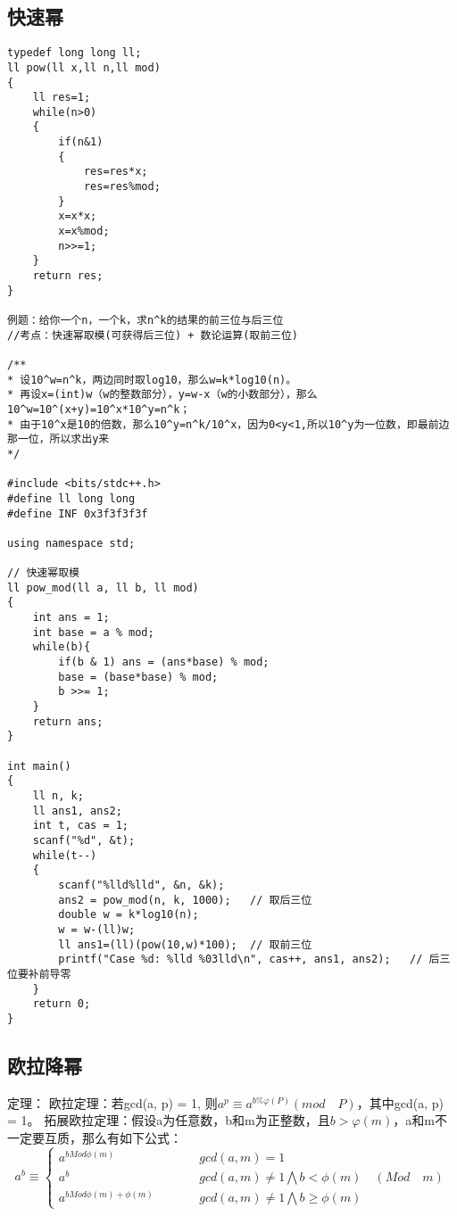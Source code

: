 \subsection{快速幂}
\begin{lstlisting}
typedef long long ll;
ll pow(ll x,ll n,ll mod)
{
	ll res=1;
	while(n>0)
	{
		if(n&1)	
		{
			res=res*x;
			res=res%mod;
		}
		x=x*x;
		x=x%mod;
		n>>=1;
	}
	return res;	
}

例题：给你一个n，一个k，求n^k的结果的前三位与后三位
//考点：快速幂取模(可获得后三位) + 数论运算(取前三位)

/**
* 设10^w=n^k，两边同时取log10，那么w=k*log10(n)。
* 再设x=(int)w（w的整数部分），y=w-x（w的小数部分），那么10^w=10^(x+y)=10^x*10^y=n^k；
* 由于10^x是10的倍数，那么10^y=n^k/10^x，因为0<y<1,所以10^y为一位数，即最前边那一位，所以求出y来
*/

#include <bits/stdc++.h>
#define ll long long
#define INF 0x3f3f3f3f

using namespace std;

// 快速幂取模
ll pow_mod(ll a, ll b, ll mod)
{
	int ans = 1;
	int base = a % mod;
	while(b){
		if(b & 1) ans = (ans*base) % mod;
		base = (base*base) % mod;
		b >>= 1;
	}
	return ans;
}

int main()
{
	ll n, k;
	ll ans1, ans2;
	int t, cas = 1;
	scanf("%d", &t);
	while(t--)
	{
		scanf("%lld%lld", &n, &k);
		ans2 = pow_mod(n, k, 1000);   // 取后三位
		double w = k*log10(n);
		w = w-(ll)w;
		ll ans1=(ll)(pow(10,w)*100);  // 取前三位
		printf("Case %d: %lld %03lld\n", cas++, ans1, ans2);   // 后三位要补前导零
	}
	return 0;
}
\end{lstlisting}

\subsection{欧拉降幂}
定理：
\newline
欧拉定理：若gcd(a, p) = 1, 则$ a^{p}\equiv a^{b\%\varphi(P)}(mod\quad P) $，其中gcd(a, p) = 1。
\newline
拓展欧拉定理：假设a为任意数，b和m为正整数，且$ b>\varphi(m) $，a和m不一定要互质，那么有如下公式：
\newline
$$
a^b \equiv
\left\{
\begin{array}{lcl}
	a^{bMod\phi(m)} & &\qquad gcd(a,m)=1 \\
	a^b & &\qquad gcd(a,m)\ne 1\bigwedge b<\phi(m)\quad (Mod\quad m) \\
	a^{bMod\phi(m)+\phi(m)} & &\qquad gcd(a,m)\ne 1\bigwedge b \ge\phi(m)
\end{array}
\right.
$$

